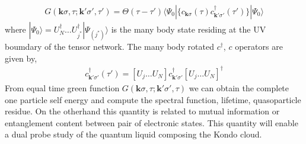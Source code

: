 \documentclass[aps,prl,preprint,groupedaddress]{revtex4-2}
\begin{document}
\begin{eqnarray}
G(\mathbf{k}\sigma,\tau;\mathbf{k}'\sigma',\tau')=\Theta(\tau-\tau')\langle\Psi_{0}|\lbrace c_{\mathbf{k}\sigma}(\tau)c^{\dagger}_{\mathbf{k}'\sigma'}(\tau')\rbrace|\Psi_{0}\rangle
\end{eqnarray} 
where $|\Psi_{0}\rangle= U^{\dagger}_{N}\ldots U^{\dagger}_{j^{*}}|\Psi_{(j^{*})}\rangle$ is the many body state residing at the UV boumdary of the tensor network. The many body rotated $c^{\dagger}$, $c$ operators are given by,
\begin{eqnarray}
c^{\dagger}_{\mathbf{k}'\sigma'}(\tau')=[U_{j}\ldots U_{N}]c^{\dagger}_{\mathbf{k}'\sigma'}[U_{j}\ldots U_{N}]^{\dagger}
\end{eqnarray}
From equal time green function $G(\mathbf{k}\sigma,\tau;\mathbf{k}'\sigma',\tau)$ we can obtain the complete one particle self energy and compute the spectral function, lifetime, quasoparticle residue. On the otherhand this quantity is related to mutual information or entanglement content between pair of electronic states. This quantity will enable a dual probe study of the quantum liquid composing the Kondo cloud.
%





\end{document}
